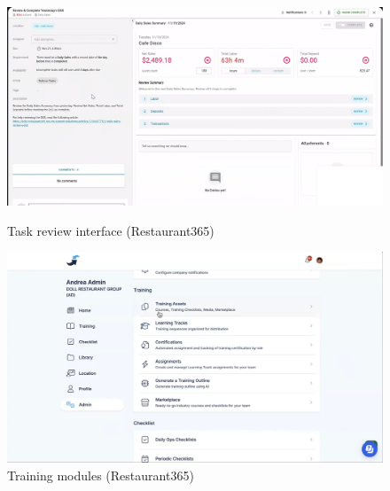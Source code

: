 \documentclass[]{VUMIFTemplateClass}
\begin{document}
\begin{figure}[h]
    \centering
    \begin{minipage}{0.48\textwidth}
        \centering
        \includegraphics[width=\textwidth]{images/examples/task_review_r365.png}
        \caption{Task review interface (Restaurant365)}
    \end{minipage}
    \hfill
    \begin{minipage}{0.48\textwidth}
        \centering
        \includegraphics[width=\textwidth]{images/examples/trainings_r365.png}
        \caption{Training modules (Restaurant365)}
    \end{minipage}
\end{figure}




\end{document}
